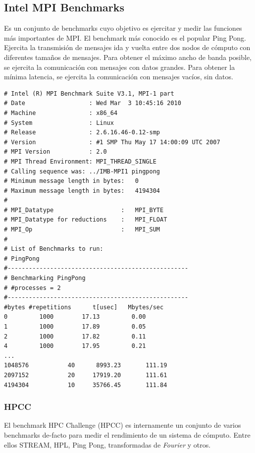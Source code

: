 \documentclass[a4paper]{report}
\begin{document}
\subsection{Intel MPI Benchmarks}

Es un conjunto de benchmarks cuyo objetivo es ejercitar y medir las funciones
m\'as importantes de MPI. El benchmark m\'as conocido es el popular Ping Pong.
Ejercita la transmisi\'on de mensajes ida y vuelta entre dos nodos de
c\'omputo con diferentes tama\~nos de mensajes. Para obtener el m\'aximo ancho
de banda posible, se ejercita la comunicaci\'on con mensajes con datos grandes.
Para obtener la m\'inima latencia, se ejercita la comunicaci\'on con mensajes
vac\'ios, sin datos.

\begin{verbatim}
# Intel (R) MPI Benchmark Suite V3.1, MPI-1 part
# Date                  : Wed Mar  3 10:45:16 2010
# Machine               : x86_64
# System                : Linux
# Release               : 2.6.16.46-0.12-smp
# Version               : #1 SMP Thu May 17 14:00:09 UTC 2007
# MPI Version           : 2.0
# MPI Thread Environment: MPI_THREAD_SINGLE
# Calling sequence was: ../IMB-MPI1 pingpong
# Minimum message length in bytes:   0
# Maximum message length in bytes:   4194304
#
# MPI_Datatype                   :   MPI_BYTE
# MPI_Datatype for reductions    :   MPI_FLOAT
# MPI_Op                         :   MPI_SUM
#
# List of Benchmarks to run:
# PingPong
#---------------------------------------------------
# Benchmarking PingPong
# #processes = 2
#---------------------------------------------------
#bytes #repetitions      t[usec]   Mbytes/sec
0         1000        17.13         0.00
1         1000        17.89         0.05
2         1000        17.82         0.11
4         1000        17.95         0.21
...
1048576           40      8993.23       111.19
2097152           20     17919.20       111.61
4194304           10     35766.45       111.84
\end{verbatim}

\subsubsection{HPCC}

El benchmark HPC Challenge \cite{hpcc} (HPCC) es internamente un conjunto de
varios benchmarks de-facto para medir el rendimiento de un sistema de
c\'omputo. Entre ellos STREAM, HPL, Ping Pong, transformadas de {\it Fourier}
y otros.

\bigskip
\end{document}
